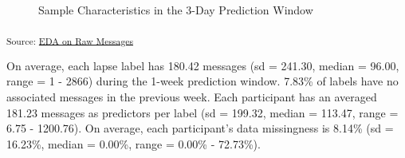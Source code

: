 \documentclass[
  letterpaper,
  DIV=11,
  numbers=noendperiod]{scrartcl}
\begin{document}
\begin{figure}[H]


\caption{\label{fig-3day}Sample Characteristics in the 3-Day Prediction
Window}

\end{figure}%

\textsubscript{Source:
\href{https://jjcurtin.github.io/study_messages/notebooks/fig_eda_messages-preview.html\#cell-fig-3day}{EDA
on Raw Messages}}

On average, each lapse label has 180.42 messages (sd = 241.30, median =
96.00, range = 1 - 2866) during the 1-week prediction window. 7.83\% of
labels have no associated messages in the previous week. Each
participant has an averaged 181.23 messages as predictors per label (sd
= 199.32, median = 113.47, range = 6.75 - 1200.76). On average, each
participant's data missingness is 8.14\% (sd = 16.23\%, median = 0.00\%,
range = 0.00\% - 72.73\%).
\end{document}
